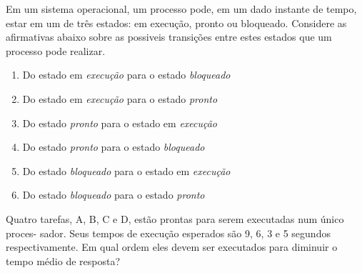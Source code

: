 \documentclass[10pt,a4paper]{article}
\begin{document}
{
\def\AMCbeginQuestion#1#2{\par\noindent{\bf (POSCOMP 2004 - Questão 39)}}
\begin{question}{}Em um sistema operacional, um processo pode, em um dado instante de tempo, estar
em um de três estados: em execução, pronto ou bloqueado. Considere as afirmativas abaixo sobre as possiveis transições entre estes estados que um processo pode realizar.
\begin{enumerate}[label=\Roman*.]
\item Do estado em \emph{execução} para o estado \emph{bloqueado}
\item Do estado em \emph{execução} para o estado \emph{pronto}
\item Do estado \emph{pronto} para o estado em \emph{execução}
\item Do estado \emph{pronto} para o estado \emph{bloqueado}
\item Do estado \emph{bloqueado} para o estado em \emph{execução}
\item Do estado \emph{bloqueado} para o estado \emph{pronto}
\end{enumerate}
\begin{choices}
\end{choices}
\end{question}
}

{
\def\AMCbeginQuestion#1#2{\par\noindent{\bf (POSCOMP 2005 - Questão 36)}}
\begin{question}{} Quatro tarefas, A, B, C e D, estão prontas para serem executadas num único proces-
sador. Seus tempos de execução esperados são 9, 6, 3 e 5 segundos respectivamente. Em qual ordem eles devem ser executados para diminuir o tempo médio de resposta?
\begin{choices}
\end{choices}
\end{question}
}
\end{document}
